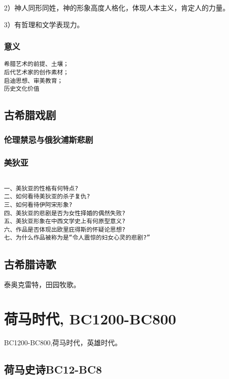 \documentclass[UTF8]{../RepresentationUniverse}
\begin{document}
2）神人同形同姓，神的形象高度人格化，体现人本主义，肯定人的力量。

3）有哲理和文学表现力。


\subsubsection{意义}

\begin{lstlisting}
希腊艺术的前提、土壤；
后代艺术家的创作素材；
启迪思想、审美教育；
历史文化价值
\end{lstlisting}


\subsection{古希腊戏剧}

\subsubsection{伦理禁忌与俄狄浦斯悲剧}

\subsubsection{美狄亚}

\begin{lstlisting}

一、美狄亚的性格有何特点?
二、如何看待美狄亚的杀子复仇?
三、如何看待伊阿宋形象?
四、美狄亚的悲剧是否为女性择婚的偶然失败?
五、美狄亚形象在中西文学史上有何原型意义?
六、作品是否体现出欧里庇得斯的怀疑论思想?
七、为什么作品被称为是“令人震惊的妇女心灵的悲剧?”

\end{lstlisting}


\subsection{古希腊诗歌}

泰奥克雷特，田园牧歌。


\section{荷马时代, BC1200-BC800}
BC1200-BC800,荷马时代，英雄时代。

\subsection{荷马史诗BC12-BC8}
\end{document}

